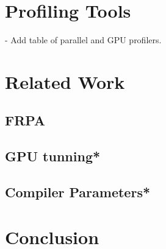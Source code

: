 \documentclass[a4paper, 12pt]{article}
\begin{document}
\section{Profiling Tools} \label{sec:profilers}

- Add table of parallel and GPU profilers.


\section{Related Work} \label{sec:related}

\subsection{FRPA}

\subsection{GPU tunning*}

\subsection{Compiler Parameters*}

\section{Conclusion} \label{sec:conclusion}



\end{document}
